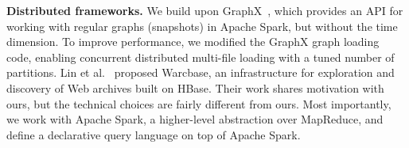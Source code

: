{\bf Distributed frameworks.}  We build upon
GraphX~\cite{DBLP:conf/osdi/GonzalezXDCFS14}, which provides an API
for working with regular graphs (snapshots) in Apache Spark, but
without the time dimension.  To improve performance, we modified the
GraphX graph loading code, enabling concurrent distributed multi-file
loading with a tuned number of partitions.
%
%
%
Lin et al.~\cite{DBLP:conf/www/LinGR14} proposed Warcbase, an
infrastructure for exploration and discovery of Web archives built on
HBase.  Their work shares motivation with ours, but the technical
choices are fairly different from ours.  Most importantly, we work
with Apache Spark, a higher-level abstraction over MapReduce, and
define a declarative query language on top of Apache Spark.

